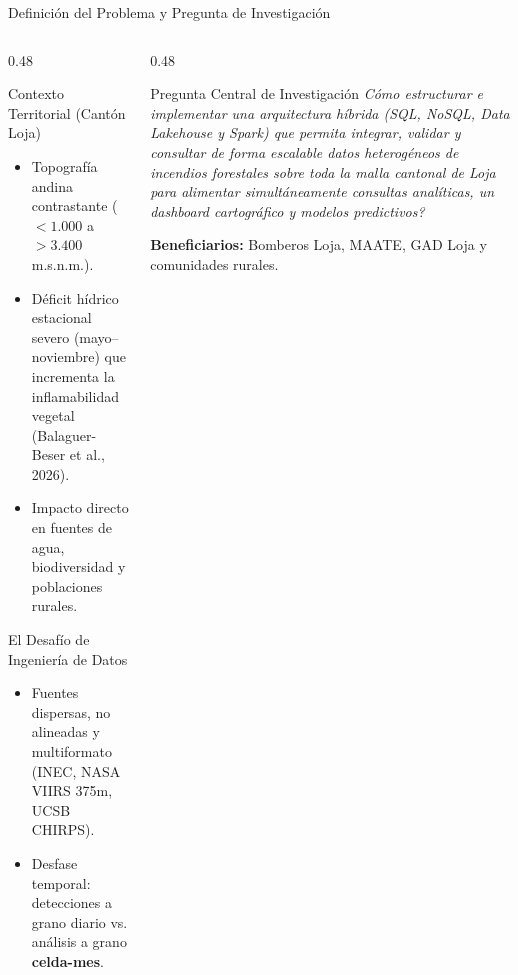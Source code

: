 \documentclass[aspectratio=169,11pt]{beamer}
\newcommand{\seccionactual}{Sustentaci\'on Final}
\begin{document}
\renewcommand{\seccionactual}{Problema \& Pregunta}
\begin{frame}{Definici\'on del Problema y Pregunta de Investigaci\'on}
  \begin{columns}
    \begin{column}{0.48\textwidth}
      \begin{block}{Contexto Territorial (Cant\'on Loja)}
        \begin{itemize}\small
          \item Topograf\'ia andina contrastante ($<1.000$ a $>3.400$\,m.s.n.m.).
          \item D\'eficit h\'idrico estacional severo (mayo--noviembre) que incrementa la inflamabilidad vegetal (Balaguer-Beser et al., 2026).
          \item Impacto directo en fuentes de agua, biodiversidad y poblaciones rurales.
        \end{itemize}
      \end{block}
      \begin{alertblock}{El Desaf\'io de Ingenier\'ia de Datos}
        \begin{itemize}\footnotesize
          \item Fuentes dispersas, no alineadas y multiformato (INEC, NASA VIIRS 375m, UCSB CHIRPS).
          \item Desfase temporal: detecciones a grano diario vs. an\'alisis a grano \textbf{celda-mes}.
        \end{itemize}
      \end{alertblock}
    \end{column}
    \begin{column}{0.48\textwidth}
      \begin{exampleblock}{Pregunta Central de Investigaci\'on}
        \small\textit{\textquestiondown C\'omo estructurar e implementar una arquitectura h\'ibrida (SQL, NoSQL, Data Lakehouse y Spark) que permita integrar, validar y consultar de forma escalable datos heterog\'eneos de incendios forestales sobre toda la malla cantonal de Loja para alimentar simult\'aneamente consultas anal\'iticas, un dashboard cartogr\'afico y modelos predictivos?}
      \end{exampleblock}
      \vspace{0.2cm}
      \textbf{Beneficiarios:} Bomberos Loja, MAATE, GAD Loja y comunidades rurales.
    \end{column}
  \end{columns}
\end{frame}
\end{document}

